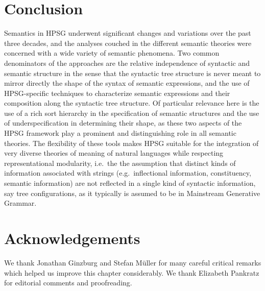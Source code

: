 \documentclass[output=paper
	        ,collection
	        ,collectionchapter
 	        ,biblatex
                ,babelshorthands
                ,newtxmath
                ,draftmode
                ,colorlinks, citecolor=brown
]{langscibook}
\begin{document}
\section{Conclusion}

Semantics in HPSG underwent significant changes and variations over the past three decades, and the analyses couched in the different semantic theories were concerned with a wide variety of semantic phenomena. Two common denominators of the approaches are the relative independence of syntactic and
 semantic structure in the sense that the syntactic tree structure is never meant to mirror directly the shape of the syntax of semantic expressions, and the use of HPSG-specific techniques to characterize semantic expressions and their composition along the syntactic tree structure. Of particular relevance here is the use of a rich sort hierarchy in the specification of semantic structures and the use of underspecification in determining their shape, as these two aspects of the HPSG framework play a prominent and distinguishing role in all semantic theories. The flexibility of these tools makes HPSG suitable for the integration of very diverse theories of meaning of natural languages while respecting representational modularity, i.e.\ the 
the assumption that 
 distinct kinds of information associated with strings (e.g.\ inflectional information, constituency, semantic information) are not reflected in a single kind of syntactic information, say tree configurations, as it typically is assumed to be in Mainstream Generative Grammar.


\section*{Acknowledgements}

We thank Jonathan Ginzburg and Stefan M\"uller for many careful critical remarks which helped
us improve this chapter considerably. We thank
Elizabeth Pankratz for editorial comments and proofreading.


{\sloppy
\printbibliography[heading=subbibliography,notkeyword=this] 
}
\end{document}
